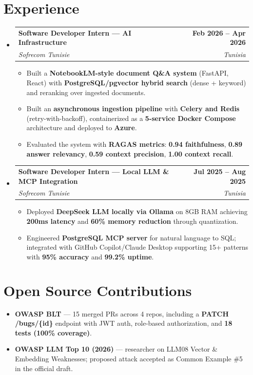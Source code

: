 \documentclass[letterpaper,9.5pt]{article}
\makeatletter
\newcommand{\resumeItem}[1]{\item\small{{#1 \vspace{-2pt}}}}
\newcommand{\resumeSubheading}[4]{
  \vspace{-3pt}\item
  \begin{tabular*}{1.0\textwidth}[t]{l@{\extracolsep{\fill}}r}
  \textbf{#1} & \textbf{\small #2} \\
  \textit{\small#3} & \textit{\small #4} \\
  \end{tabular*}\vspace{-7pt}
}
\newcommand{\resumeItemListStart}{\begin{itemize}[leftmargin=*]\setlength\itemsep{0pt}\setlength\parsep{0pt}}
\newcommand{\resumeItemListEnd}{\end{itemize}\vspace{-4pt}}
\makeatother
\begin{document}
\section{Experience}
\begin{itemize}[leftmargin=0.15in, label={}]

  \resumeSubheading
    {Software Developer Intern --- AI Infrastructure}{Feb 2026 -- Apr 2026}
    {Sofrecom Tunisie}{Tunisia}
  \resumeItemListStart
    \resumeItem{Built a \textbf{NotebookLM-style document Q\&A system} (FastAPI, React) with \textbf{PostgreSQL/pgvector hybrid search} (dense + keyword) and reranking over ingested documents.}
    \resumeItem{Built an \textbf{asynchronous ingestion pipeline} with \textbf{Celery and Redis} (retry-with-backoff), containerized as a \textbf{5-service Docker Compose} architecture and deployed to \textbf{Azure}.}
    \resumeItem{Evaluated the system with \textbf{RAGAS metrics}: \textbf{0.94 faithfulness}, \textbf{0.89 answer relevancy}, \textbf{0.59 context precision}, \textbf{1.00 context recall}.}
  \resumeItemListEnd

  \resumeSubheading
    {Software Developer Intern --- Local LLM \& MCP Integration}{Jul 2025 -- Aug 2025}
    {Sofrecom Tunisie}{Tunisia}
  \resumeItemListStart
    \resumeItem{Deployed \textbf{DeepSeek LLM locally via Ollama} on 8GB RAM achieving \textbf{200ms latency} and \textbf{60\% memory reduction} through quantization.}
    \resumeItem{Engineered \textbf{PostgreSQL MCP server} for natural language to SQL; integrated with GitHub Copilot/Claude Desktop supporting 15+ patterns with \textbf{95\% accuracy} and \textbf{99.2\% uptime}.}
  \resumeItemListEnd

\end{itemize}

\section{Open Source Contributions}
\begin{itemize}[leftmargin=0.15in, label={}]
  \resumeItem{\textbf{OWASP BLT} --- 15 merged PRs across 4 repos, including a \textbf{PATCH /bugs/\{id\}} endpoint with JWT auth, role-based authorization, and \textbf{18 tests (100\% coverage)}.}
  \resumeItem{\textbf{OWASP LLM Top 10 (2026)} --- researcher on LLM08 Vector \& Embedding Weaknesses; proposed attack accepted as Common Example \#5 in the official draft.}
\end{itemize}
\end{document}
